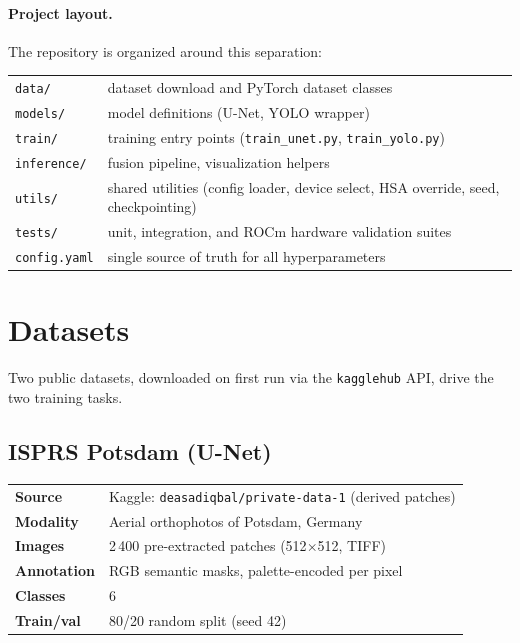 \documentclass[11pt,a4paper]{article}
\begin{document}
\paragraph{Project layout.} The repository is organized around this separation:

\begin{center}\footnotesize
\begin{tabular}{ll}
\toprule
\texttt{data/}      & dataset download and PyTorch dataset classes \\
\texttt{models/}    & model definitions (U-Net, YOLO wrapper) \\
\texttt{train/}     & training entry points (\texttt{train\_unet.py}, \texttt{train\_yolo.py}) \\
\texttt{inference/} & fusion pipeline, visualization helpers \\
\texttt{utils/}     & shared utilities (config loader, device select, HSA override, seed, checkpointing) \\
\texttt{tests/}     & unit, integration, and ROCm hardware validation suites \\
\texttt{config.yaml} & single source of truth for all hyperparameters \\
\bottomrule
\end{tabular}
\end{center}

\section{Datasets}

Two public datasets, downloaded on first run via the \texttt{kagglehub} API, drive
the two training tasks.

\subsection{ISPRS Potsdam (U-Net)}

\begin{tabularx}{\linewidth}{l X}
\toprule
\textbf{Source}       & Kaggle: \texttt{deasadiqbal/private-data-1} (derived patches) \\
\textbf{Modality}     & Aerial orthophotos of Potsdam, Germany \\
\textbf{Images}       & 2\,400 pre-extracted patches (512$\times$512, TIFF) \\
\textbf{Annotation}   & RGB semantic masks, palette-encoded per pixel \\
\textbf{Classes}      & 6 \\
\textbf{Train/val}    & 80/20 random split (seed 42) \\
\bottomrule
\end{tabularx}
\end{document}
